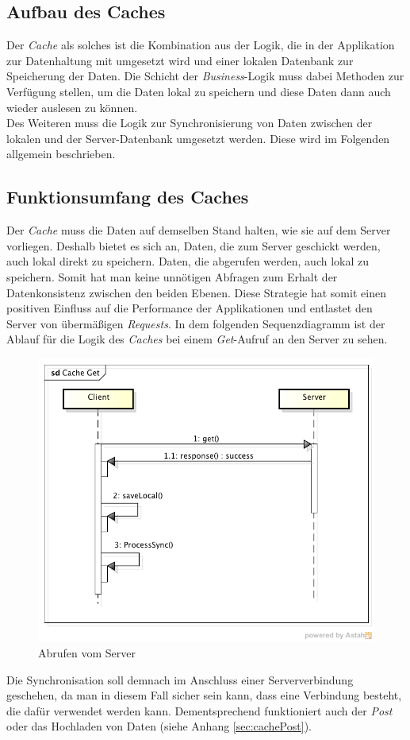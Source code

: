 \subsection{Aufbau des Caches}
\label{ssec:cache-aufbau}
Der \textit{Cache} als solches ist die Kombination aus der Logik, die in der Applikation zur Datenhaltung mit umgesetzt wird und einer lokalen Datenbank zur Speicherung der Daten. Die Schicht der \textit{Business}-Logik muss dabei Methoden zur Verfügung stellen, um die Daten lokal zu speichern und diese Daten dann auch wieder auslesen zu können.\\
Des Weiteren muss die Logik zur Synchronisierung von Daten zwischen der lokalen und der Server-Datenbank umgesetzt werden. Diese wird im Folgenden allgemein beschrieben.
\subsection{Funktionsumfang des Caches}
\label{ssec:cache-unsere-funktionsweise}
Der \textit{Cache} muss die Daten auf demselben Stand halten, wie sie auf dem Server vorliegen. Deshalb bietet es sich an, Daten, die zum Server geschickt werden, auch lokal direkt zu speichern. Daten, die abgerufen werden, auch lokal zu speichern. Somit hat man keine unnötigen Abfragen zum Erhalt der Datenkonsistenz zwischen den beiden Ebenen. Diese Strategie hat somit einen positiven Einfluss auf die Performance der Applikationen und entlastet den Server von übermäßigen \textit{Requests}. In dem folgenden Sequenzdiagramm ist der Ablauf für die Logik des \textit{Caches} bei einem \textit{Get}-Aufruf an den Server zu sehen.
\begin{figure}[h]
\centering
\includegraphics[width=0.8\linewidth]{content/images/Cache-Get}
\caption{Abrufen vom Server}
\label{pic:cacheGet}
\end{figure}
Die Synchronisation soll demnach im Anschluss einer Serververbindung geschehen, da man in diesem Fall sicher sein kann, dass eine Verbindung besteht, die dafür verwendet werden kann. Dementsprechend funktioniert auch der \textit{Post} oder das Hochladen von Daten (siehe Anhang \ref{sec:cachePost}).